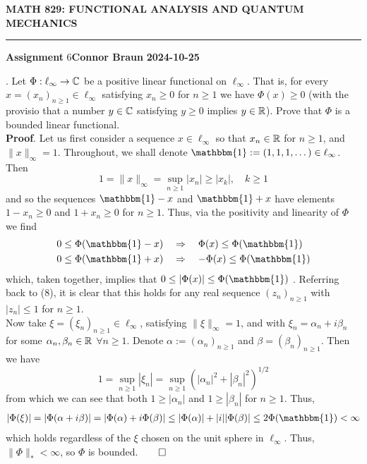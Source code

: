 \documentclass[10pt]{article}
\newcommand{\1}[1]{\mathbbm{1}_{#1}} \newcommand{\mc}[1]{\mathcal{#1}}
\begin{document}
    \begin{center}
        {\bf\large{MATH 829: FUNCTIONAL ANALYSIS AND QUANTUM MECHANICS}}
        \smallskip
        \hrule
        \smallskip
        {\bf Assignment} 6\hfill {\bf Connor Braun} \hfill {\bf 2024-10-25}
    \end{center}
    \vspace{5pt}
    . Let $\Phi:\ell_\infty\rightarrow\mathbb{C}$ be a positive linear functional on $\ell_\infty$. That is, for every $x=(x_n)_{n\geq 1}\in\ell_\infty$ satisfying $x_n\geq 0$ for $n\geq 1$ we have
    $\Phi(x)\geq 0$ (with the provisio that a number $y\in\mathbb{C}$ satisfying $y\geq 0$ implies $y\in\mathbb{R}$). Prove that $\Phi$ is a bounded linear functional.\\[5pt]
    {\bf Proof}. Let us first consider a sequence $x\in\ell_\infty$ so that $x_n\in\mathbb{R}$ for $n\geq 1$, and $\|x\|_\infty=1$. Throughout, we shall denote $\mathbbm{1}:=(1,1,1,\dots)\in\ell_\infty$. Then
    \[1=\|x\|_\infty =\sup_{n\geq 1}|x_n|\geq |x_k|,\quad k\geq 1\tag{8}\]
    and so the sequences $\mathbbm{1}-x$ and $\mathbbm{1}+x$ have elements $1-x_n\geq 0$ and $1+x_n\geq 0$  for $n\geq 1$. Thus, via the positivity and linearity of $\Phi$ we find
    \begin{align*}
        0\leq \Phi(\mathbbm{1}-x)\quad&\Rightarrow\quad \Phi(x)\leq \Phi(\mathbbm{1}) \\
        0\leq \Phi(\mathbbm{1}+x)\quad&\Rightarrow\quad -\Phi(x)\leq \Phi(\mathbbm{1})
    \end{align*}
    which, taken together, implies that $0\leq |\Phi(x)|\leq \Phi(\mathbbm{1})$ . Referring back to (8), it is clear that this holds for any real sequence $(z_n)_{n\geq 1}$ with $|z_n|\leq 1$ for $n\geq 1$.\\[5pt]
    Now take $\xi=(\xi_n)_{n\geq 1}\in\ell_\infty$, satisfying $\|\xi\|_\infty=1$, and with $\xi_n=\alpha_n+i\beta_n$ for some $\alpha_n,\beta_n\in\mathbb{R}$ $\forall n\geq 1$. Denote $\alpha:=(\alpha_n)_{n\geq 1}$ and $\beta=(\beta_n)_{n\geq 1}$. Then we have
    \[1=\sup_{n\geq 1}|\xi_n|=\sup_{n\geq 1}(|\alpha_n|^2+|\beta_n|^2)^{1/2}\]
    from which we can see that both $1\geq |\alpha_n|$ and $1\geq |\beta_n|$ for $n\geq 1$. Thus,
    \begin{align*}
        |\Phi(\xi)|=|\Phi(\alpha+i\beta)|=|\Phi(\alpha)+i\Phi(\beta)|\leq |\Phi(\alpha)|+|i||\Phi(\beta)|\leq 2\Phi(\mathbbm{1})<\infty
    \end{align*}
    which holds regardless of the $\xi$ chosen on the unit sphere in $\ell_\infty$. Thus, $\|\Phi\|_\ast<\infty$, so $\Phi$ is bounded.\hfill{$\qed$}
\end{document}
